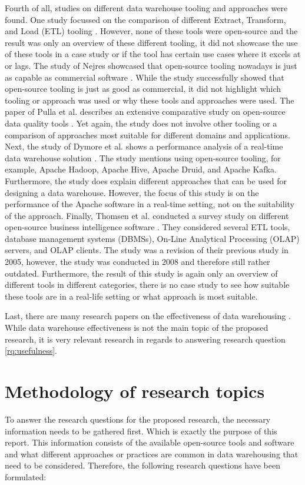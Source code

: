 \documentclass[11pt]{article}
\begin{document}
Fourth of all, studies on different data warehouse tooling and approaches were found. One study focussed on the comparison of different Extract, Transform, and Load (ETL) tooling \cite{etl_comparison}. However, none of these tools were open-source and the result was only an overview of these different tooling, it did not showcase the use of these tools in a case study or if the tool has certain use cases where it excels at or lags. The study of Nejres showcased that open-source tooling nowadays is just as capable as commercial software \cite{nejres2015analysis}. While the study successfully showed that open-source tooling is just as good as commercial, it did not highlight which tooling or approach was used or why these tools and approaches were used. The paper of Pulla et al. describes an extensive comparative study on open-source data quality tools \cite{pulla2016open}. Yet again, the study does not involve other tooling or a comparison of approaches most suitable for different domains and applications. Next, the study of Dymore et al. shows a performance analysis of a real-time data warehouse solution \cite{dymora2023performance}. The study mentions using open-source tooling, for example, Apache Hadoop, Apache Hive, Apache Druid, and Apache Kafka. Furthermore, the study does explain different approaches that can be used for designing a data warehouse. However, the focus of this study is on the performance of the Apache software in a real-time setting, not on the suitability of the approach. Finally, Thomsen et al. conducted a survey study on different open-source business intelligence software \cite{thomsen2009survey}. They considered several ETL tools, database management systems (DBMSs), On‐Line Analytical Processing (OLAP) servers, and OLAP clients. The study was a revision of their previous study in 2005, however, the study was conducted in 2008 and therefore still rather outdated. Furthermore, the result of this study is again only an overview of different tools in different categories, there is no case study to see how suitable these tools are in a real-life setting or what approach is most suitable.

Last, there are many research papers on the effectiveness of data warehousing \cite{al2023empirical, rahman2022empirical, ramamurthy2008data}. While data warehouse effectiveness is not the main topic of the proposed research, it is very relevant research in regards to answering research question \ref{rq:usefulness}.\\

\section{Methodology of research topics}
\label{methodology}
To answer the research questions for the proposed research, the necessary information needs to be gathered first. Which is exactly the purpose of this report. This information consists of the available open-source tools and software and what different approaches or practices are common in data warehousing that need to be considered. Therefore, the following research questions have been formulated: \\
\end{document}
